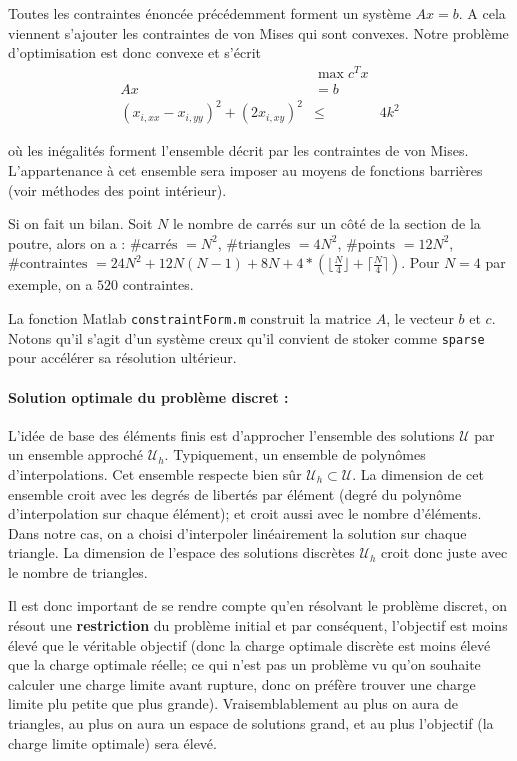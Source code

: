 Toutes les contraintes énoncée précédemment forment un système $Ax=b$. A cela viennent s'ajouter les contraintes de von Mises qui sont convexes. Notre problème d'optimisation est donc convexe et s'écrit 
\begin{equation}
\begin{aligned} \label{eq:SystToSolve}
& \max c^T x\\
 Ax &= b\\
 (x_{i,xx}-x_{i,yy})^2+(2x_{i,xy})^2 & \leq & 4k^2
\end{aligned}
\end{equation}

où les inégalités forment l'ensemble décrit par les contraintes de von Mises. L'appartenance à cet ensemble sera imposer au moyens de fonctions barrières (voir méthodes des point intérieur). 

Si on fait un bilan. Soit $N$ le nombre de carrés sur un côté de la section de la poutre, alors on a : $\text{\# carrés  } = N^2$, $\text{\# triangles  } = 4N^2$, $\text{\# points  } = 12 N^2$, $\text{\# contraintes  } = 24N^2+12N(N-1)+8N + 4*\left(  \lfloor \frac{N}{4} \rfloor + \lceil \frac{N}{4} \rceil \right)$.
Pour $N=4$ par exemple, on a $520$ contraintes.

La fonction Matlab \texttt{constraintForm.m} construit la matrice $A$, le vecteur $b$ et $c$. Notons qu'il s'agit d'un système creux qu'il convient de stoker comme \texttt{sparse} pour accélérer sa résolution ultérieur.

\paragraph{Solution optimale du problème discret : } L'idée de base des éléments finis est d'approcher l'ensemble des solutions $\mathcal{U}$ par un ensemble approché $\mathcal{U}_h$. Typiquement, un ensemble de polynômes d'interpolations. Cet ensemble respecte bien sûr $\mathcal{U}_h \subset \mathcal{U}$. La dimension de cet ensemble croit avec les degrés de libertés par élément (degré du polynôme d'interpolation sur chaque élément); et croit aussi avec le nombre d'éléments. Dans notre cas, on a choisi d'interpoler linéairement la solution sur chaque triangle. La dimension de l'espace des solutions discrètes $\mathcal{U}_h$ croit donc juste avec le nombre de triangles. 

Il est donc important de se rendre compte qu'en résolvant le problème discret, on résout une \textbf{restriction} du problème initial et par conséquent, l'objectif est moins élevé que le véritable objectif (donc la charge optimale discrète est moins élevé que la charge optimale réelle; ce qui n'est pas un problème vu qu'on souhaite calculer une charge limite avant rupture, donc on préfère trouver une charge limite plu petite que plus grande). Vraisemblablement au plus on aura de triangles, au plus on aura un espace de solutions grand, et au plus l'objectif (la charge limite optimale) sera élevé.

